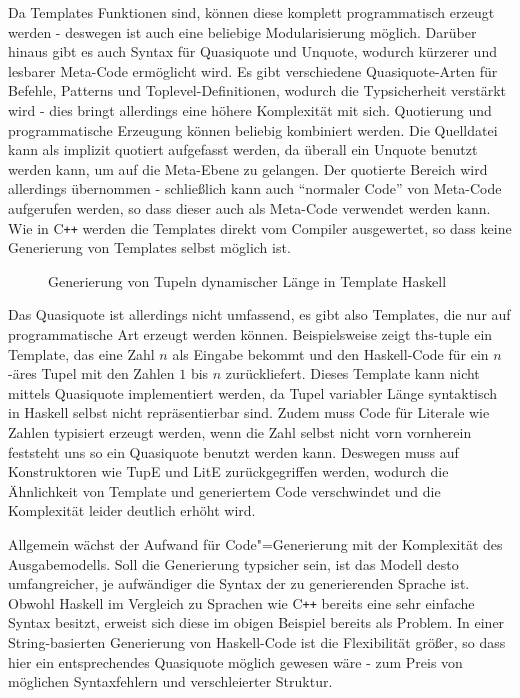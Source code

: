 \documentclass[11pt, a4paper, bibgerm]{scrbook}
\newcommand\abb{}
\newcommand{\cgen}{Code"=Generierung}
\newcommand{\cpp}{C\texttt{++}}
\begin{document}
Da Templates Funktionen sind, können diese komplett programmatisch
erzeugt werden - deswegen ist auch eine beliebige Modularisierung
möglich. Darüber hinaus gibt es auch Syntax für Quasiquote und Unquote,
wodurch kürzerer und lesbarer Meta-Code ermöglicht wird. Es gibt
verschiedene Quasiquote-Arten für Befehle, Patterns und
Toplevel-Definitionen, wodurch die Typsicherheit verstärkt wird - dies
bringt allerdings eine höhere Komplexität mit sich. Quotierung und
programmatische Erzeugung können beliebig kombiniert werden. Die
Quelldatei kann als implizit quotiert aufgefasst werden, da überall ein
Unquote benutzt werden kann, um auf die Meta-Ebene zu gelangen. Der
quotierte Bereich wird allerdings übernommen - schließlich kann auch
"`normaler Code"' von Meta-Code aufgerufen werden, so dass dieser auch
als Meta-Code verwendet werden kann. Wie in \cpp{} werden die Templates
direkt vom Compiler ausgewertet, so dass keine Generierung von Templates
selbst möglich ist.

\begin{figure}[h]
  \centering
  \caption{Generierung von Tupeln dynamischer Länge in Template Haskell}
  \label{magicl:fig:ths-tuple}
\end{figure}

Das Quasiquote ist allerdings nicht umfassend, es gibt also Templates, die
nur auf programmatische Art erzeugt werden können. Beispielsweise zeigt
\abb{ths-tuple} ein Template, das eine Zahl $n$ als Eingabe bekommt und
den Haskell-Code für ein $n$-äres Tupel mit den Zahlen $1$ bis $n$
zurückliefert. Dieses Template kann nicht mittels Quasiquote implementiert
werden, da Tupel variabler Länge syntaktisch in Haskell selbst nicht
repräsentierbar sind. Zudem muss Code für Literale wie Zahlen typisiert
erzeugt werden, wenn die Zahl selbst nicht vorn vornherein feststeht uns
so ein Quasiquote benutzt werden kann. Deswegen muss auf Konstruktoren wie
TupE und LitE zurückgegriffen werden, wodurch die Ähnlichkeit von
Template und generiertem Code verschwindet und die Komplexität leider
deutlich erhöht wird.

Allgemein wächst der Aufwand für \cgen{} mit der Komplexität des
Ausgabemodells. Soll die Generierung typsicher sein, ist das Modell
desto umfangreicher, je aufwändiger die Syntax der zu generierenden
Sprache ist. Obwohl Haskell im Vergleich zu Sprachen wie \cpp{} bereits
eine sehr einfache Syntax besitzt, erweist sich diese im obigen Beispiel
bereits als Problem. In einer String-basierten Generierung von
Haskell-Code ist die Flexibilität größer, so dass hier ein
entsprechendes Quasiquote möglich gewesen wäre - zum Preis von möglichen
Syntaxfehlern und verschleierter Struktur.
\end{document}
